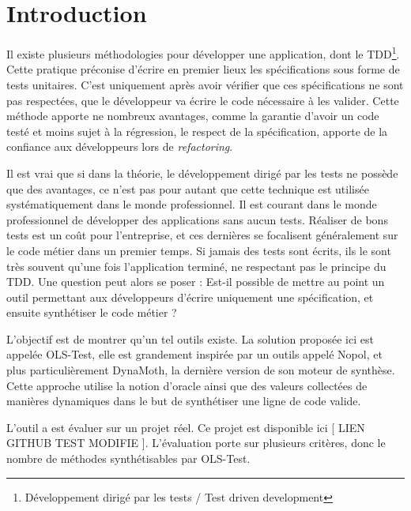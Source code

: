 \chapter*{Introduction}
	\thispagestyle{introduction}


\par Il existe plusieurs méthodologies pour développer une application, dont le TDD\footnote{Développement dirigé par les tests / Test driven development}. Cette pratique préconise d'écrire en premier lieux les spécifications sous forme de tests unitaires. C'est uniquement après avoir vérifier que ces spécifications ne sont pas respectées, que le développeur va écrire le code nécessaire à les valider. Cette méthode apporte ne nombreux avantages, comme la garantie d'avoir un code testé et moins sujet à la régression, le respect de la spécification, apporte de la confiance aux développeurs lors de \textit{refactoring}.\newline

\par Il est vrai que si dans la théorie, le développement dirigé par les tests ne possède que des avantages, ce n'est pas pour autant que cette technique est utilisée systématiquement dans le monde professionnel. Il est courant dans le monde professionnel de développer des applications sans aucun tests. Réaliser de bons tests est un coût pour l'entreprise, et ces dernières se focalisent généralement sur le code métier dans un premier temps. Si jamais des tests sont écrits, ils le sont très souvent qu'une fois l'application terminé, ne respectant pas le principe du TDD. Une question peut alors se poser : Est-il possible de mettre au point un outil permettant aux développeurs d'écrire uniquement une spécification, et ensuite synthétiser le code métier ?
\newline

\par L'objectif est de montrer qu'un tel outils existe. La solution proposée ici est appelée OLS-Test, elle est grandement inspirée par un outils appelé Nopol\cite{nopol}, et plus particulièrement DynaMoth\cite{dynamoth}, la dernière version de son moteur de synthèse. Cette approche utilise la notion d'oracle ainsi que des valeurs collectées de manières dynamiques dans le but de synthétiser une ligne de code valide.
\newline

\par L'outil a est évaluer sur un projet réel. Ce projet est disponible ici [ LIEN GITHUB TEST MODIFIE ]. L'évaluation porte sur plusieurs critères, donc le nombre de méthodes synthétisables par OLS-Test.
